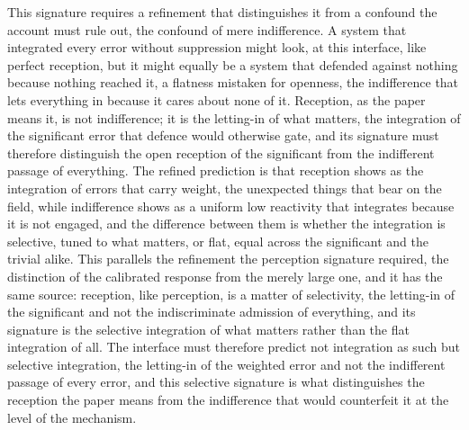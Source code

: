 This signature requires a refinement that distinguishes it from a confound the account must rule out, the confound of mere indifference. A system that integrated every error without suppression might look, at this interface, like perfect reception, but it might equally be a system that defended against nothing because nothing reached it, a flatness mistaken for openness, the indifference that lets everything in because it cares about none of it. Reception, as the paper means it, is not indifference; it is the letting-in of what matters, the integration of the significant error that defence would otherwise gate, and its signature must therefore distinguish the open reception of the significant from the indifferent passage of everything. The refined prediction is that reception shows as the integration of errors that carry weight, the unexpected things that bear on the field, while indifference shows as a uniform low reactivity that integrates because it is not engaged, and the difference between them is whether the integration is selective, tuned to what matters, or flat, equal across the significant and the trivial alike. This parallels the refinement the perception signature required, the distinction of the calibrated response from the merely large one, and it has the same source: reception, like perception, is a matter of selectivity, the letting-in of the significant and not the indiscriminate admission of everything, and its signature is the selective integration of what matters rather than the flat integration of all. The interface must therefore predict not integration as such but selective integration, the letting-in of the weighted error and not the indifferent passage of every error, and this selective signature is what distinguishes the reception the paper means from the indifference that would counterfeit it at the level of the mechanism.

